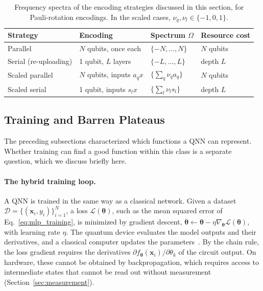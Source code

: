 \documentclass[12pt]{article}
\numberwithin{equation}{section}  %
\begin{document}
\begin{table}[htbp]
\centering
\caption{Frequency spectra of the encoding strategies discussed in this section, for Pauli-rotation encodings. In the scaled cases, $\nu_q, \nu_l \in \{-1, 0, 1\}$.}
\label{tab:encoding_strategies}
\small
\begin{tabular}{llll}
\toprule
Strategy & Encoding & Spectrum $\Omega$ & Resource cost \\
\midrule
Parallel & $N$ qubits, once each & $\{-N, \ldots, N\}$ & $N$ qubits \\
Serial (re-uploading) & 1 qubit, $L$ layers & $\{-L, \ldots, L\}$ & depth $L$ \\
Scaled parallel & $N$ qubits, inputs $a_q x$ & $\{\sum_q \nu_q a_q\}$ & $N$ qubits \\
Scaled serial & 1 qubit, inputs $s_l x$ & $\{\sum_l \nu_l s_l\}$ & depth $L$ \\
\bottomrule
\end{tabular}
\end{table}



\subsection{Training and Barren Plateaus}
\label{sec:training}

The preceding subsections characterized which functions a QNN can represent. Whether training can find a good function within this class is a separate question, which we discuss briefly here.

\paragraph{The hybrid training loop.} A QNN is trained in the same way as a classical network. Given a dataset $\mathcal{D} = \{(\mathbf{x}_i, y_i)\}_{i=1}^{N}$, a loss $\mathcal{L}(\boldsymbol{\theta})$, such as the mean squared error of Eq.~\eqref{eq:mlp_training}, is minimized by gradient descent, $\boldsymbol{\theta} \leftarrow \boldsymbol{\theta} - \eta \nabla_{\boldsymbol{\theta}} \mathcal{L}(\boldsymbol{\theta})$, with learning rate $\eta$. The quantum device evaluates the model outputs and their derivatives, and a classical computer updates the parameters~\cite{cerezo2021variational}. By the chain rule, the loss gradient requires the derivatives $\partial f_{\boldsymbol{\theta}}(\mathbf{x}_i)/\partial \theta_k$ of the circuit output. On hardware, these cannot be obtained by backpropagation, which requires access to intermediate states that cannot be read out without measurement (Section~\ref{sec:measurement}).
\end{document}
